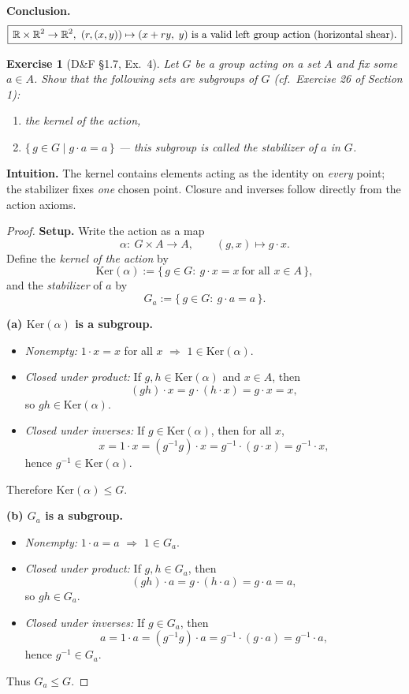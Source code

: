 \documentclass[12pt]{article}
\newtheorem{exercise}[theorem]{Exercise}
\theoremstyle{definition}
\begin{document}
\noindent\textbf{Conclusion.}
\[
\boxed{\,\Bbb R \times \Bbb R^2 \to \Bbb R^2,\ (r,(x,y))\mapsto (x+ r y,\; y)\ \text{is a valid left group action (horizontal shear).}\,}
\]

\newpage

\begin{exercise}[D\&F §1.7, Ex.~4]
Let $G$ be a group acting on a set $A$ and fix some $a\in A$. Show that the following sets are subgroups of $G$ \textup{(cf.\ Exercise 26 of Section 1)}:
\begin{enumerate}
\item[(a)] the kernel of the action,
\item[(b)] $\{\,g\in G \mid g\cdot a=a\,\}$ — this subgroup is called the stabilizer of $a$ in $G$.
\end{enumerate}
\end{exercise}

\dotfill

\noindent\textbf{Intuition.}
The kernel contains elements acting as the identity on \emph{every} point; the stabilizer fixes \emph{one} chosen point.
Closure and inverses follow directly from the action axioms.

\dotfill

\begin{proof}
\noindent\textbf{Setup.} Write the action as a map
\[
\alpha:\ G\times A \longrightarrow A,\qquad (g,x)\longmapsto g\cdot x.
\]
Define the \emph{kernel of the action} by
\[
\mathrm{Ker}(\alpha):=\{\,g\in G:\ g\cdot x=x\ \text{for all }x\in A\,\},
\]
and the \emph{stabilizer} of $a$ by
\[
G_a:=\{\,g\in G:\ g\cdot a=a\,\}.
\]

\smallskip
\noindent\textbf{(a) $\mathrm{Ker}(\alpha)$ is a subgroup.}
\begin{itemize}
  \item \emph{Nonempty:} $1\cdot x=x$ for all $x$ $\Rightarrow$ $1\in \mathrm{Ker}(\alpha)$.
  \item \emph{Closed under product:} If $g,h\in \mathrm{Ker}(\alpha)$ and $x\in A$, then
  \[
  (gh)\cdot x = g\cdot(h\cdot x)=g\cdot x = x,
  \]
  so $gh\in \mathrm{Ker}(\alpha)$.
  \item \emph{Closed under inverses:} If $g\in \mathrm{Ker}(\alpha)$, then for all $x$,
  \[
  x=1\cdot x=(g^{-1}g)\cdot x = g^{-1}\cdot(g\cdot x)=g^{-1}\cdot x,
  \]
  hence $g^{-1}\in \mathrm{Ker}(\alpha)$.
\end{itemize}
Therefore $\mathrm{Ker}(\alpha)\le G$.

\smallskip
\noindent\textbf{(b) $G_a$ is a subgroup.}
\begin{itemize}
  \item \emph{Nonempty:} $1\cdot a=a$ $\Rightarrow$ $1\in G_a$.
  \item \emph{Closed under product:} If $g,h\in G_a$, then
  \[
  (gh)\cdot a = g\cdot(h\cdot a)=g\cdot a=a,
  \]
  so $gh\in G_a$.
  \item \emph{Closed under inverses:} If $g\in G_a$, then
  \[
  a=1\cdot a=(g^{-1}g)\cdot a=g^{-1}\cdot(g\cdot a)=g^{-1}\cdot a,
  \]
  hence $g^{-1}\in G_a$.
\end{itemize}
Thus $G_a\le G$.
\end{proof}
\end{document}
